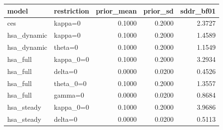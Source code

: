\begin{tabular}{llrrr}
\toprule
model & restriction & prior\_mean & prior\_sd & sddr\_bf01 \\
\midrule
ces & kappa=0 & 0.1000 & 0.2000 & 2.3727 \\
hsa\_dynamic & kappa=0 & 0.1000 & 0.2000 & 1.4589 \\
hsa\_dynamic & theta=0 & 0.1000 & 0.2000 & 1.1549 \\
hsa\_full & kappa\_0=0 & 0.1000 & 0.2000 & 3.2934 \\
hsa\_full & delta=0 & 0.0000 & 0.0200 & 0.4526 \\
hsa\_full & theta\_0=0 & 0.1000 & 0.2000 & 1.3557 \\
hsa\_full & gamma=0 & 0.0000 & 0.0200 & 0.8684 \\
hsa\_steady & kappa\_0=0 & 0.1000 & 0.2000 & 3.9686 \\
hsa\_steady & delta=0 & 0.0000 & 0.0200 & 0.5113 \\
\bottomrule
\end{tabular}
